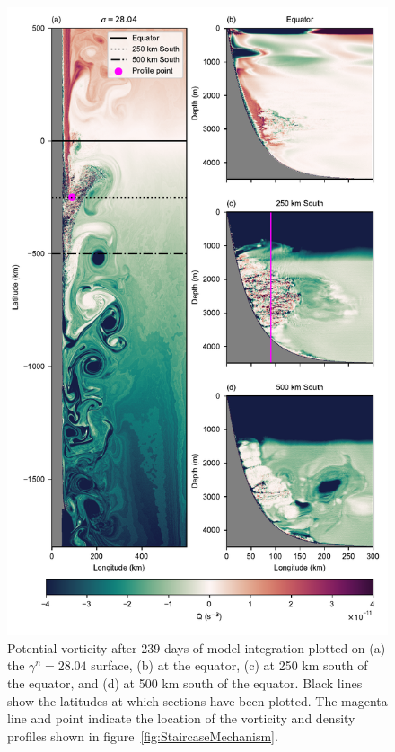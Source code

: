 \begin{figure}[hp]
    \centering
    \includegraphics{../figures/Figure4.pdf}
    \caption{Potential vorticity after 239 days of model integration plotted on (a) the $\gamma^n = 28.04$ surface, (b) at the equator, (c) at 250 km south of the equator, and (d) at 500 km south of the equator. Black lines show the latitudes at which sections have been plotted. The magenta line and point indicate the location of the vorticity and density profiles shown in figure~\ref{fig:StaircaseMechanism}.}
    \label{fig:PV}
\end{figure}

